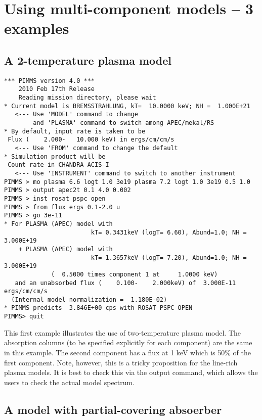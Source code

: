 \section{Using multi-component models -- 3 examples}

\subsection{A 2-temperature plasma model}

\begin{verbatim}
*** PIMMS version 4.0 ***
    2010 Feb 17th Release
    Reading mission directory, please wait
* Current model is BREMSSTRAHLUNG, kT=  10.0000 keV; NH =  1.000E+21
   <--- Use 'MODEL' command to change
        and 'PLASMA' command to switch among APEC/mekal/RS
* By default, input rate is taken to be
 Flux (    2.000-   10.000 keV) in ergs/cm/cm/s
   <--- Use 'FROM' command to change the default
* Simulation product will be
 Count rate in CHANDRA ACIS-I
   <--- Use 'INSTRUMENT' command to switch to another instrument
PIMMS > mo plasma 6.6 logt 1.0 3e19 plasma 7.2 logt 1.0 3e19 0.5 1.0
PIMMS > output apec2t 0.1 4.0 0.002
PIMMS > inst rosat pspc open
PIMMS > from flux ergs 0.1-2.0 u
PIMMS > go 3e-11
* For PLASMA (APEC) model with
                        kT= 0.3431keV (logT= 6.60), Abund=1.0; NH =  3.000E+19
    + PLASMA (APEC) model with
                        kT= 1.3657keV (logT= 7.20), Abund=1.0; NH =  3.000E+19
             (  0.5000 times component 1 at     1.0000 keV)
   and an unabsorbed flux (    0.100-    2.000keV) of  3.000E-11 ergs/cm/cm/s
  (Internal model normalization =  1.180E-02)
* PIMMS predicts  3.846E+00 cps with ROSAT PSPC OPEN
PIMMS> quit
\end{verbatim}

This first example illustrates the use of two-temperature plasma
model.  The absorption columns (to be specified explicitly for each component)
are the same in this example.  The second component has a flux at 1 keV which
is 50\% of the first component.  Note, however, this is a tricky proposition
for the line-rich plasma models.  It is best to check this via the output
command, which allows the users to check the actual model spectrum.

\subsection{A model with partial-covering absoerber}

